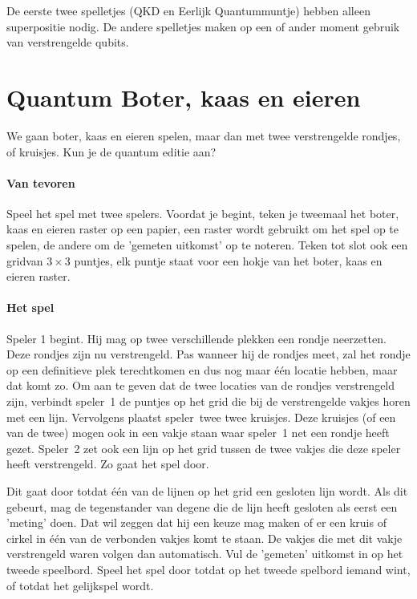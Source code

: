 \documentclass[../../main.tex]{subfiles}
\begin{document}
De eerste twee spelletjes (QKD en Eerlijk Quantummuntje) hebben alleen superpositie nodig. De andere spelletjes maken op een of ander moment gebruik van verstrengelde qubits.



\section{Quantum Boter, kaas en eieren}
We gaan boter, kaas en eieren spelen, maar dan met twee verstrengelde rondjes, of kruisjes. Kun je de quantum editie aan?

\paragraph*{Van tevoren}
Speel het spel met twee spelers. Voordat je begint, teken je tweemaal het boter, kaas en eieren raster op een papier, een raster wordt gebruikt om het spel op te spelen, de andere om de 'gemeten uitkomst' op te noteren. Teken tot slot ook een gridvan $3 \times 3$ puntjes, elk puntje staat voor een hokje van het boter, kaas en eieren raster.

\paragraph*{Het spel}
Speler 1 begint. Hij mag op twee verschillende plekken een rondje neerzetten. Deze rondjes zijn nu verstrengeld. Pas wanneer hij de rondjes meet, zal het rondje op een definitieve plek terechtkomen en dus nog maar \'e\'en locatie hebben, maar dat komt zo. Om aan te geven dat de twee locaties van de rondjes verstrengeld zijn, verbindt speler~1 de puntjes op het grid die bij de verstrengelde vakjes horen met een lijn. Vervolgens plaatst speler~twee twee kruisjes. Deze kruisjes (of een van de twee) mogen ook in een vakje staan waar speler~1 net een rondje heeft gezet. Speler~2 zet ook een lijn op het grid tussen de twee vakjes die deze speler heeft verstrengeld. Zo gaat het spel door.

Dit gaat door totdat \'e\'en van de lijnen op het grid een gesloten lijn wordt. Als dit gebeurt, mag de tegenstander van degene die de lijn heeft gesloten als eerst een 'meting' doen. Dat wil zeggen dat hij een keuze mag maken of er een kruis of cirkel in \'e\'en van de verbonden vakjes komt te staan. De vakjes die met dit vakje verstrengeld waren volgen dan automatisch. Vul de 'gemeten' uitkomst in op het tweede speelbord. Speel het spel door totdat op het tweede spelbord iemand wint, of totdat het gelijkspel wordt.
\end{document}

